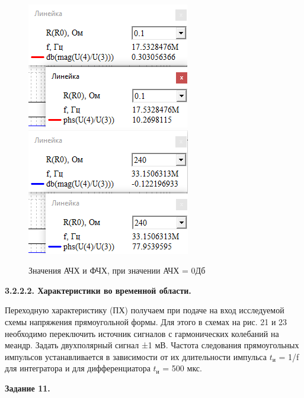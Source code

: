 \documentclass[a4paper,14pt]{extarticle}
\begin{document}
    \begin{figure}[h!]
        \begin{center}
           \includegraphics[scale=1]{26.png}
            \includegraphics[scale=1]{27.png}           
        \end{center}
        \caption{Значения АЧХ и ФЧХ, при значении АЧХ = 0Дб}
        \vspace{-0.7cm}
    \end{figure}   

    \begin{center}
        \textbf{3.2.2.2. Характеристики во временной области.}
    \end{center}

    Переходную характеристику (ПХ) получаем при подаче на вход исследуемой 
    схемы напряжения прямоугольной формы. Для этого в схемах на рис. 21 и 
    23 необходимо переключить источник сигналов с гармонических колебаний 
    на меандр. Задать двухполярный сигнал ±1 мВ. Частота следования 
    прямоугольных импульсов устанавливается в зависимости от их 
    длительности импульса $t_\text{и}$ = 1/f для интегратора и для 
    дифференциатора $t_\text{и}$ = 500 мкс.

    \begin{center}
        \textbf{Задание 11.}
    \end{center}
    
\end{document}
